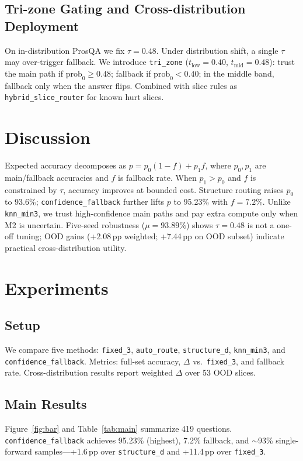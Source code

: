 \documentclass[11pt,a4paper]{article}
\begin{document}
\subsection{Tri-zone Gating and Cross-distribution Deployment}
On in-distribution ProsQA we fix $\tau{=}0.48$. Under distribution shift, a single $\tau$ may over-trigger fallback. We introduce \texttt{tri\_zone} ($t_{\mathrm{low}}{=}0.40$, $t_{\mathrm{mid}}{=}0.48$): trust the main path if $\mathrm{prob}_0\ge0.48$; fallback if $\mathrm{prob}_0<0.40$; in the middle band, fallback only when the answer flips. Combined with slice rules as \texttt{hybrid\_slice\_router} for known hurt slices.

\section{Discussion}
Expected accuracy decomposes as $p=p_0(1-f)+p_1 f$, where $p_0,p_1$ are main/fallback accuracies and $f$ is fallback rate. When $p_1>p_0$ and $f$ is constrained by $\tau$, accuracy improves at bounded cost. Structure routing raises $p_0$ to 93.6\%; \texttt{confidence\_fallback} further lifts $p$ to 95.23\% with $f{=}7.2\%$. Unlike \texttt{knn\_min3}, we trust high-confidence main paths and pay extra compute only when M2 is uncertain. Five-seed robustness ($\mu{=}93.89\%$) shows $\tau{=}0.48$ is not a one-off tuning; OOD gains (+2.08\,pp weighted; +7.44\,pp on OOD subset) indicate practical cross-distribution utility.

\section{Experiments}
\subsection{Setup}
We compare five methods: \texttt{fixed\_3}, \texttt{auto\_route}, \texttt{structure\_d}, \texttt{knn\_min3}, and \texttt{confidence\_fallback}. Metrics: full-set accuracy, $\Delta$ vs.\ \texttt{fixed\_3}, and fallback rate. Cross-distribution results report weighted $\Delta$ over 53 OOD slices.

\subsection{Main Results}
Figure~\ref{fig:bar} and Table~\ref{tab:main} summarize 419 questions. \texttt{confidence\_fallback} achieves 95.23\% (highest), 7.2\% fallback, and $\sim$93\% single-forward samples---+1.6\,pp over \texttt{structure\_d} and +11.4\,pp over \texttt{fixed\_3}.
\end{document}
